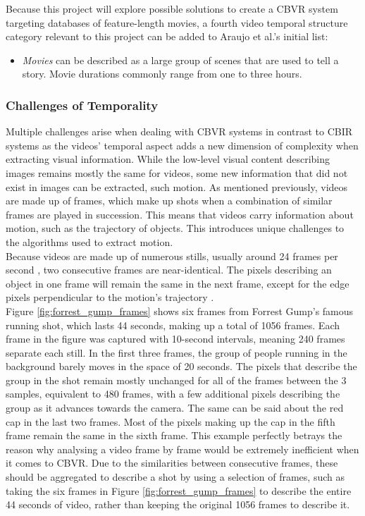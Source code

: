 Because this project will explore possible solutions to create a CBVR system targeting databases of feature-length movies, a fourth video temporal structure category relevant to this project can be added to Araujo et al.'s initial list:
\begin{itemize}
    \item \textit{Movies} can be described as a large group of scenes that are used to tell a story. Movie durations commonly range from one to three hours.
\end{itemize}

\subsubsection{Challenges of Temporality}

Multiple challenges arise when dealing with CBVR systems in contrast to CBIR systems as the videos' temporal aspect adds a new dimension of complexity when extracting visual information. While the low-level visual content describing images remains mostly the same for videos, some new information that did not exist in images can be extracted, such motion. As mentioned previously, videos are made up of frames, which make up shots when a combination of similar frames are played in succession. This means that videos carry information about motion, such as the trajectory of objects. This introduces unique challenges to the algorithms used to extract motion.\\

Because videos are made up of numerous stills, usually around 24 frames per second \cite{brownlow1980silentfilm}, two consecutive frames are near-identical. The pixels describing an object in one frame will remain the same in the next frame, except for the edge pixels perpendicular to the motion's trajectory \cite{bradski2008opencv}.\\

Figure \ref{fig:forrest_gump_frames} shows six frames from Forrest Gump's famous running shot, which lasts 44 seconds, making up a total of 1056 frames. Each frame in the figure was captured with 10-second intervals, meaning 240 frames separate each still. In the first three frames, the group of people running in the background barely moves in the space of 20 seconds. The pixels that describe the group in the shot remain mostly unchanged for all of the frames between the 3 samples, equivalent to 480 frames, with a few additional pixels describing the group as it advances towards the camera. The same can be said about the red cap in the last two frames. Most of the pixels making up the cap in the fifth frame remain the same in the sixth frame. This example perfectly betrays the reason why analysing a video frame by frame would be extremely inefficient when it comes to CBVR. Due to the similarities between consecutive frames, these should be aggregated \cite{araujo2017i2v} to describe a shot by using a selection of frames, such as taking the six frames in Figure \ref{fig:forrest_gump_frames} to describe the entire 44 seconds of video, rather than keeping the original 1056 frames to describe it.

